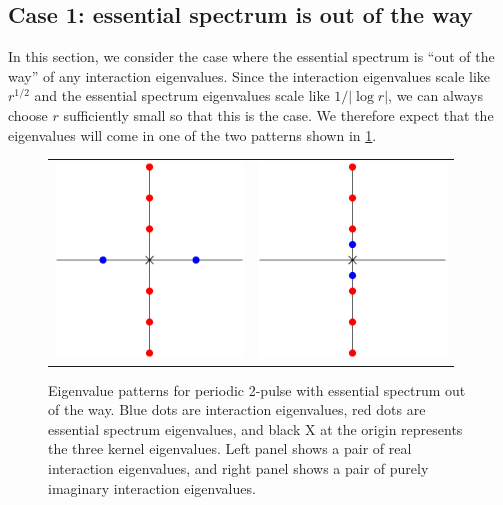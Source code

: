 \documentclass[thesis.tex]{subfiles}
\begin{document}
\subsection{Case 1: essential spectrum is out of the way}\label{section:2pernobubble}

In this section, we consider the case where the essential spectrum is ``out of the way'' of any interaction eigenvalues. Since the interaction eigenvalues scale like $r^{1/2}$ and the essential spectrum eigenvalues scale like $1/|\log r|$, we can always choose $r$ sufficiently small so that this is the case. We therefore expect that the eigenvalues will come in one of the two patterns shown in \cref{fig:2ppatterns}.

\begin{figure}[H]
\begin{center}
\begin{tabular}{cc}
\includegraphics[width=5cm]{images/kdv5/2punstableeigpattern.eps} &
\includegraphics[width=5cm]{images/kdv5/2pstableeigpattern.eps} 
\end{tabular}
\caption{Eigenvalue patterns for periodic 2-pulse with essential spectrum out of the way. Blue dots are interaction eigenvalues, red dots are essential spectrum eigenvalues, and black X at the origin represents the three kernel eigenvalues. Left panel shows a pair of real interaction eigenvalues, and right panel shows a pair of purely imaginary interaction eigenvalues. }
\label{fig:2ppatterns}
\end{center}
\end{figure}
\end{document}
